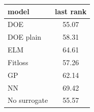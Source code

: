 \begin{tabular}{|lc|}
\hline
model & last rank\\
\hline
DOE & 55.07 \\
DOE plain & 58.31 \\
ELM & 64.61 \\
Fitloss & 57.26 \\
GP & 62.14 \\
NN & 69.42 \\
No surrogate & 55.57 \\
\hline
\end{tabular}

